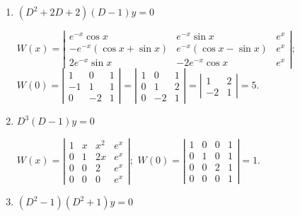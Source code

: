 \documentclass{ximera}
\begin{document}
\begin{problem}
\begin{enumerate}
    \item $(D^2+2D+2)(D-1)y=0$

\begin{solution}
$
W(x)=\left|\begin{array}{ccc}
e^{-x}\cos x&e^{-x}\sin x&e^x\\
-e^{-x}(\cos x+\sin x)&e^{-x}(\cos x-\sin x)&e^x\\
2e^{-x}\sin x&-2e^{-x}\cos x&
e^x\end{array}\right|;
$
$
W(0)=\left|\begin{array}{rrc}
1&0&1\\-1&1&1\\0&-2&1
\end{array}\right|=
\left|\begin{array}{rrc}
1&0&1\\0&1&2\\0&-2&1
\end{array}\right|=
\left|\begin{array}{rcc}
1&2\\-2&1\end{array}\right|=5.
$
\end{solution}

    \item $D^3(D-1)y=0$

\begin{solution}
$
W(x)=\left|\begin{array}{cccc}
1&x&x^2&e^x\\
0&1&2x&e^x\\0&0&2&e^x\\0&0&0&e^x\end{array}\right|;
$
$
W(0)=\left|\begin{array}{cccc}
1&0&0&1\\0&1&0&1\\0&0&2&1\\0&0&0&1
\end{array}\right|=1.
$
\end{solution}

    \item $(D^2-1)(D^2+1)y=0$


\end{enumerate}
\end{problem}
\end{document}
